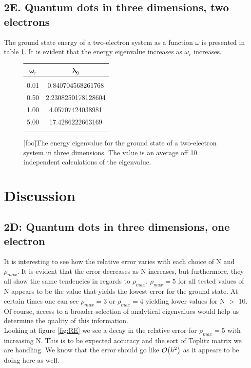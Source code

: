 \documentclass[%
reprint,
amsmath,amssymb,
aps,
]{revtex4-1}
\begin{document}
\subsection*{2E. Quantum dots in three dimensions, two electrons} \noindent 
The ground state energy of a two-electron system as a function $\omega$ is presented in table \ref{tab2}. It is evident that the energy eigenvalue increases as $\omega_r$ increases. 

\begin{figure}[!h]
	\begin{tabular} {|c|c|}
		\hline
		$\mathbf{\omega}_r$ & $\mathbf{\lambda}_0$\\ 
		\hline
		& \\ 
0.01 &  0.840704568261768 \\
0.50 &  2.2308250178128604 \\
1.00 &  4.05707424038981 \\
5.00 &  17.4286222663169 \\ &\\
\hline 
	\end{tabular}
	[foo]{The energy eigenvalue for the ground state of a two-electron system in three dimensions. The value is an average off 10 independent calculations of the eigenvalue.\label{tab2}}
\end{figure}


\section*{Discussion} 

\subsection*{2D: Quantum dots in three dimensions, one electron} \noindent 
It is interesting to see how the relative error varies with each choice of N and $\rho_{max}$. It is evident that the error decreases as N increases, but furthermore, they all show the same tendencies in regards to $\rho_{max}$. $\rho_{max} = 5$ for all tested values of N appears to be the value that yields the lowest error for the ground state. At certain times one can see $\rho_{max} = 3$ or $\rho_{max} = 4$ yielding lower values for N $>$ 10. Of course, access to a broader selection of analytical eigenvalues would help us determine the quality of this information. \\
Looking at figure \ref{fig:RE} we see a decay in the relative error for $\rho_{max} = 5$ with increasing N. This is to be expected accuracy and the sort of Toplitz matrix we are handling. We know that the error should go like $\order{h^2}$ as it appears to be doing here as well. 
\end{document}
